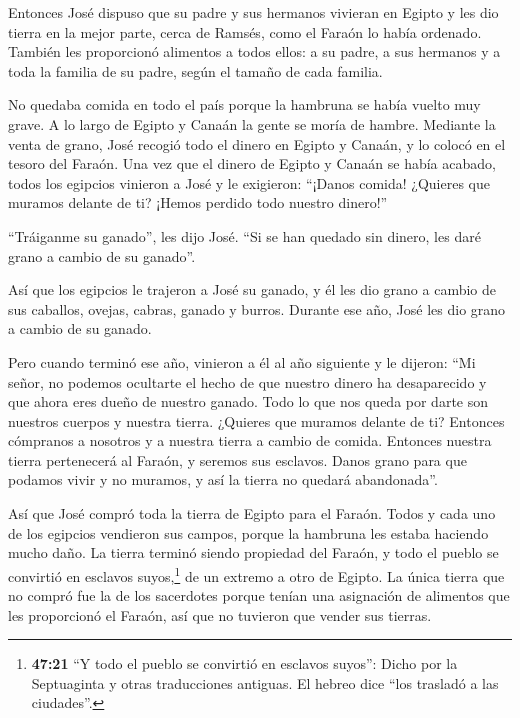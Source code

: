  Entonces José dispuso que su padre y sus hermanos vivieran
en Egipto y les dio tierra en la mejor parte, cerca de Ramsés, como el
Faraón lo había ordenado.  También les proporcionó
alimentos a todos ellos: a su padre, a sus hermanos y a toda la familia
de su padre, según el tamaño de cada familia.

 No quedaba comida en todo el país porque la hambruna se
había vuelto muy grave. A lo largo de Egipto y Canaán la gente se moría
de hambre.  Mediante la venta de grano, José recogió todo
el dinero en Egipto y Canaán, y lo colocó en el tesoro del Faraón.
 Una vez que el dinero de Egipto y Canaán se había acabado,
todos los egipcios vinieron a José y le exigieron: ``¡Danos comida!
¿Quieres que muramos delante de ti? ¡Hemos perdido todo nuestro
dinero!''

 ``Tráiganme su ganado'', les dijo José. ``Si se han
quedado sin dinero, les daré grano a cambio de su ganado''.

 Así que los egipcios le trajeron a José su ganado, y él
les dio grano a cambio de sus caballos, ovejas, cabras, ganado y burros.
Durante ese año, José les dio grano a cambio de su ganado.

 Pero cuando terminó ese año, vinieron a él al año
siguiente y le dijeron: ``Mi señor, no podemos ocultarte el hecho de que
nuestro dinero ha desaparecido y que ahora eres dueño de nuestro ganado.
Todo lo que nos queda por darte son nuestros cuerpos y nuestra tierra.
 ¿Quieres que muramos delante de ti? Entonces cómpranos a
nosotros y a nuestra tierra a cambio de comida. Entonces nuestra tierra
pertenecerá al Faraón, y seremos sus esclavos. Danos grano para que
podamos vivir y no muramos, y así la tierra no quedará abandonada''.

 Así que José compró toda la tierra de Egipto para el
Faraón. Todos y cada uno de los egipcios vendieron sus campos, porque la
hambruna les estaba haciendo mucho daño. La tierra terminó siendo
propiedad del Faraón,  y todo el pueblo se convirtió en
esclavos suyos,\footnote{\textbf{47:21} ``Y todo el pueblo se convirtió
  en esclavos suyos'': Dicho por la Septuaginta y otras traducciones
  antiguas. El hebreo dice ``los trasladó a las ciudades''.} de un
extremo a otro de Egipto.  La única tierra que no compró
fue la de los sacerdotes porque tenían una asignación de alimentos que
les proporcionó el Faraón, así que no tuvieron que vender sus tierras.

